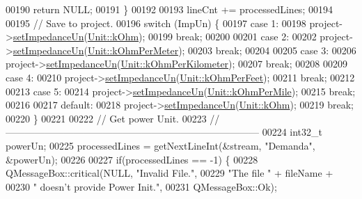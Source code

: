 \begin{DoxyCode}
00190     \textcolor{keywordflow}{return} NULL;
00191   \}
00192 
00193   lineCnt += processedLines;
00194 
00195 \textcolor{comment}{// Save to project.}
00196   \textcolor{keywordflow}{switch} (ImpUn) \{
00197   \textcolor{keywordflow}{case} 1:
00198     project->\hyperlink{class_project_a995d050781923522ae2a02728346d199}{setImpedanceUn}(\hyperlink{class_unit_a3747e779c805df24a71961290be3fbdfa6b9c74d1763eefbaf751eeecff0bd9da}{Unit::kOhm});
00199     \textcolor{keywordflow}{break};
00200 
00201   \textcolor{keywordflow}{case} 2:
00202     project->\hyperlink{class_project_a995d050781923522ae2a02728346d199}{setImpedanceUn}(\hyperlink{class_unit_a3747e779c805df24a71961290be3fbdfa35e9ca44deb5a35fdb576111cf0db336}{Unit::kOhmPerMeter});
00203     \textcolor{keywordflow}{break};
00204 
00205   \textcolor{keywordflow}{case} 3:
00206     project->\hyperlink{class_project_a995d050781923522ae2a02728346d199}{setImpedanceUn}(\hyperlink{class_unit_a3747e779c805df24a71961290be3fbdfa56a0289d2ddeff7ca4aa8ba410df79d6}{Unit::kOhmPerKilometer});
00207     \textcolor{keywordflow}{break};
00208 
00209   \textcolor{keywordflow}{case} 4:
00210     project->\hyperlink{class_project_a995d050781923522ae2a02728346d199}{setImpedanceUn}(\hyperlink{class_unit_a3747e779c805df24a71961290be3fbdfa433b57934ca3be960ec7a60f3ea6ea87}{Unit::kOhmPerFeet});
00211     \textcolor{keywordflow}{break};
00212 
00213   \textcolor{keywordflow}{case} 5:
00214     project->\hyperlink{class_project_a995d050781923522ae2a02728346d199}{setImpedanceUn}(\hyperlink{class_unit_a3747e779c805df24a71961290be3fbdfa1d5bb04c9ecda66b09891af21cd4f613}{Unit::kOhmPerMile});
00215     \textcolor{keywordflow}{break};
00216 
00217   \textcolor{keywordflow}{default}:
00218     project->\hyperlink{class_project_a995d050781923522ae2a02728346d199}{setImpedanceUn}(\hyperlink{class_unit_a3747e779c805df24a71961290be3fbdfa6b9c74d1763eefbaf751eeecff0bd9da}{Unit::kOhm});
00219     \textcolor{keywordflow}{break};
00220   \}
00221 
00222 \textcolor{comment}{// Get power Unit.}
00223 \textcolor{comment}{//------------------------------------------------------------------------------}
00224   int32\_t powerUn;
00225   processedLines = getNextLineInt(&stream, \textcolor{stringliteral}{"Demanda"}, &powerUn);
00226 
00227   \textcolor{keywordflow}{if}(processedLines == -1) \{
00228     QMessageBox::critical(NULL, \textcolor{stringliteral}{"Invalid File."},
00229                           \textcolor{stringliteral}{"The file "} + fileName +
00230                           \textcolor{stringliteral}{" doesn't provide Power Init."},
00231                           QMessageBox::Ok);

\end{DoxyCode}
